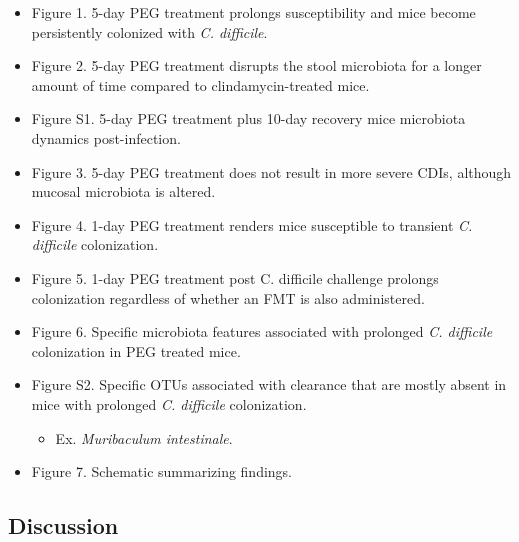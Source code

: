\documentclass[
  11pt,
]{article}
\providecommand{\tightlist}{%
  \setlength{\itemsep}{0pt}\setlength{\parskip}{0pt}}
\begin{document}
\begin{itemize}
\item
  Figure 1. 5-day PEG treatment prolongs susceptibility and mice become
  persistently colonized with \emph{C. difficile}.
\item
  Figure 2. 5-day PEG treatment disrupts the stool microbiota for a
  longer amount of time compared to clindamycin-treated mice.
\item
  Figure S1. 5-day PEG treatment plus 10-day recovery mice microbiota
  dynamics post-infection.
\item
  Figure 3. 5-day PEG treatment does not result in more severe CDIs,
  although mucosal microbiota is altered.
\item
  Figure 4. 1-day PEG treatment renders mice susceptible to transient
  \emph{C. difficile} colonization.
\item
  Figure 5. 1-day PEG treatment post C. difficile challenge prolongs
  colonization regardless of whether an FMT is also administered.
\item
  Figure 6. Specific microbiota features associated with prolonged
  \emph{C. difficile} colonization in PEG treated mice.
\item
  Figure S2. Specific OTUs associated with clearance that are mostly
  absent in mice with prolonged \emph{C. difficile} colonization.

  \begin{itemize}
  \tightlist
  \item
    Ex. \emph{Muribaculum intestinale}.
  \end{itemize}
\item
  Figure 7. Schematic summarizing findings.
\end{itemize}

\hypertarget{discussion}{%
\subsection{Discussion}\label{discussion}}
\end{document}
